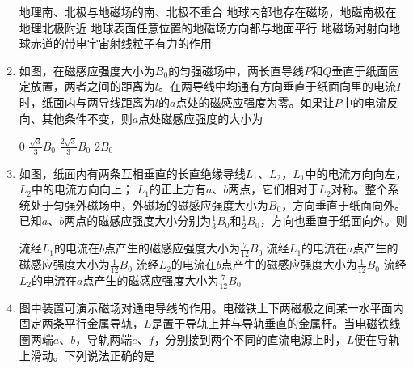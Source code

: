 \begin{enumerate}[leftmargin=0em]
\fourchoices
{地理南、北极与地磁场的南、北极不重合}
{地球内部也存在磁场，地磁南极在地理北极附近}
{地球表面任意位置的地磁场方向都与地面平行}
{地磁场对射向地球赤道的带电宇宙射线粒子有力的作用}



\item
{}
如图，在磁感应强度大小为$ B_{0} $的匀强磁场中，两长直导线$ P $和$ Q $垂直于纸面固定放置，两者之间的距离为$ l $。在两导线中均通有方向垂直于纸面向里的电流$ I $时，纸面内与两导线距离为$ l $的$ a $点处的磁感应强度为零。如果让$ P $中的电流反向、其他条件不变，则$ a $点处磁感应强度的大小为  
\begin{figure}[h!]
	\centering
	
\end{figure}
\fourchoices
{$ 0 $}
{$\frac { \sqrt { 3 } } { 3 } B _ { 0 }$}
{$\frac { 2 \sqrt { 3 } } { 3 } B _ { 0 }$}
{$2 B _ { 0 }$}





\item
{}
如图，纸面内有两条互相垂直的长直绝缘导线$ L_{1} $、$ L_{2} $，$ L_{1} $中的电流方向向左，$ L_{2} $中的电流方向向上； $ L_{1} $的正上方有$ a $、$ b $两点，它们相对于$ L_{2} $对称。整个系统处于匀强外磁场中，外磁场的磁感应强度大小为$ B_{0} $，方向垂直于纸面向外。已知$ a $、$ b $两点的磁感应强度大小分别为$ \frac{ 1 }{ 3 } B_{0} $和$ \frac{ 1 }{ 2 } B_{0} $，方向也垂直于纸面向外。则  
\begin{figure}[h!]
	\centering
	
\end{figure}


\fourchoices
{流经$ L_{1} $的电流在$ b $点产生的磁感应强度大小为$\frac { 7 } { 12 } B _ { 0 }$ }
{流经$ L_{1} $的电流在$ a $点产生的磁感应强度大小为$\frac { 1 } { 12 } B _ { 0 }$ }
{流经$ L_{2} $的电流在$ b $点产生的磁感应强度大小为$\frac { 1 } { 12 } B _ { 0 }$ }
{流经$ L_{2} $的电流在$ a $点产生的磁感应强度大小为$\frac { 7 } { 12 } B _ { 0 }$}


\item
{}
图中装置可演示磁场对通电导线的作用。电磁铁上下两磁极之间某一水平面内固定两条平行金属导轨，$ L $是置于导轨上并与导轨垂直的金属杆。当电磁铁线圈两端$ a $、$ b $，导轨两端$ e $、$ f $，分别接到两个不同的直流电源上时，$ L $便在导轨上滑动。下列说法正确的是  
\begin{figure}[h!]
	\centering
	
\end{figure}



\end{enumerate}
